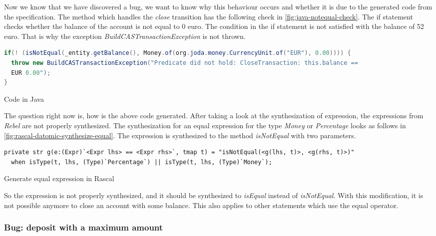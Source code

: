 Now we know that we have discovered a bug, we want to know why this behaviour
occurs and whether it is due to the generated code from the specification. The
method which handles the \textit{close} transition has the following check in
\autoref{fig:java-notequal-check}. The if statement checks whether the balance
of the account is not equal to 0 euro. The condition in the if statement is not
satisfied with the balance of 52 euro. That is why the exception
\textit{BuildCASTransactionException} is not thrown.

\begin{sourcecode}[h!]
\begin{lstlisting}[language=Java]
if(! (isNotEqual(_entity.getBalance(), Money.of(org.joda.money.CurrencyUnit.of("EUR"), 0.00)))) {
  throw new BuildCASTransactionException("Predicate did not hold: CloseTransaction: this.balance ==
  EUR 0.00");
}
\end{lstlisting}
\caption{Code in Java}\label{fig:java-notequal-check}
\end{sourcecode}
\FloatBarrier

The question right now is, how is the above code generated. After taking a look at the synthesization of
expression, the expressions from \textit{Rebel} are not properly synthesized. The
synthesization for an equal expression for the type \textit{Money} or \textit{Percentage} looks as
follows in \autoref{fig:rascal-datomic-synthesize-equal}. The expression is
synthesized to the method \textit{isNotEqual} with two parameters.

\begin{sourcecode}[h!]
\begin{lstlisting}[]
private str g(e:(Expr)`<Expr lhs> == <Expr rhs>`, tmap t) = "isNotEqual(<g(lhs, t)>, <g(rhs, t)>)"
  when isType(t, lhs, (Type)`Percentage`) || isType(t, lhs, (Type)`Money`);
\end{lstlisting}
\caption{Generate equal expression in Rascal}\label{fig:rascal-datomic-synthesize-equal}
\end{sourcecode}
\FloatBarrier

So the expression is not properly synthesized, and it should be synthesized to
\textit{isEqual} instead of \textit{isNotEqual}. With this modification, it
is not possible anymore to close an account with some balance. This also applies
to other statements which use the equal operator.

\subsubsection{Bug: deposit with a maximum amount}\label{sec:bug-compile-max-deposit}

